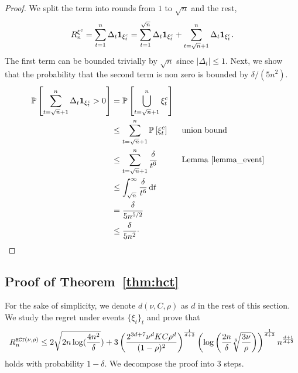 \begin{proof}
We split the term into rounds from $1$ to $\sqrt{n}$ and the rest,
\[
R_n^{\xi^c} = \sum_{t=1}^n \Delta_t {\bf 1}_{\xi_t^c} = \sum_{t=1}^{\sqrt{n}} \Delta_t {\bf 1}_{\xi_t^c} + \sum_{t=\sqrt{n}+1}^n \Delta_t {\bf 1}_{\xi_t^c}.
\]
The first term can be bounded trivially by $\sqrt{n}$ since $|\Delta_t|\leq 1$. Next, we show that the probability that the second term is non zero is bounded by $\delta/(5n^2)$.
\begin{align*}
    \mathbb{P}\left[ \sum_{t=\sqrt{n}+1}^n \Delta_t {\bf 1}_{\xi_t^c} > 0 \right] & = \mathbb{P}\left[ \bigcup\limits_{t=\sqrt{n}+1}^n \xi_t^c \right]          \\
            & \leq \sum_{t=\sqrt{n}+1}^n \mathbb{P}\left[ \xi_t^c \right] && \text{union bound} \\
            & \leq \sum_{t=\sqrt{n}+1}^n \frac{\delta}{t^6} && \text{Lemma~\ref{lemma_event}} \\
            & \leq \int_{\sqrt{n}}^{\infty} \frac{\delta}{t^6} \, \mathrm{d}t \\
            & = \frac{\delta}{5n^{5/2}} \\
            & \leq \frac{\delta}{5n^2}\cdot
\end{align*}

\end{proof}

\subsection{Proof of Theorem~\ref{thm:hct}}\label{proof:thm}
\restathm*
\noindent
For the sake of simplicity, we denote $d(\nu,C,\rho)$ as $d$ in the rest of this section. We study the regret under events $\{\xi_t\}_t$ and prove that
\[
R_n^{\texttt{HCT}(\nu,\rho)} \leq 2\sqrt{2n\operatorname{log}(\frac{4n^2}{\delta}}) + 3\left(\frac{2^{3d+7}\nu^d KC\rho^d}{(1-\rho)^{2}}\right)^{\frac{1}{d+2}}\left(\operatorname{log}\left(\frac{2n}{\delta}\sqrt[8]{\frac{3\nu}{\rho}}\right)\right)^{\frac{1}{d+2}}n^{\frac{d+1}{d+2}}
\]
holds with probability $1-\delta$. We decompose the proof into 3 steps.

